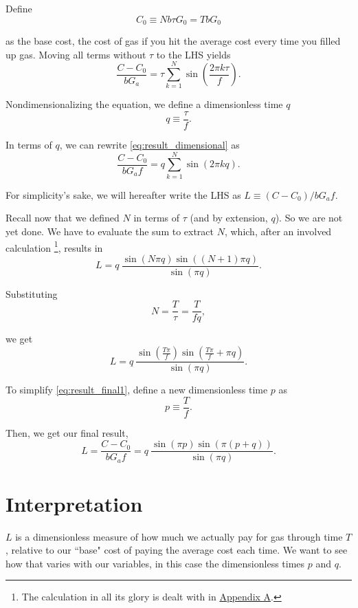 \documentclass[11pt]{article}
\begin{document}
Define 
$$
C_0 \equiv Nb\tau G_0 = TbG_0
$$

 as the base cost, the cost of gas if you hit the average cost every time you filled up gas. Moving all terms without $\tau$ to the LHS yields
\begin{equation}
\frac{C - C_0}{b G_a} = \tau \sum_{k=1}^{N}{\sin \left( \frac{2 \pi k \tau}{f}\right)} \label{eq:result_dimensional}.
\end{equation}

Nondimensionalizing the equation, we define a dimensionless time $q$
$$
q \equiv \frac{\tau}{f}.
$$ 

In terms of $q$, we can rewrite \eqref{eq:result_dimensional} as
\begin{equation}
\frac{C - C_0}{b G_a f} = q \sum_{k=1}^{N}{\sin \left( 2 \pi k q\right)}. \label{eq:result_dimensionless}
\end{equation}

For simplicity's sake, we will hereafter write the LHS as $L \equiv (C - C_0) / b G_a f$. \\

\par
Recall now that we defined $N$ in terms of $\tau$ (and by extension, $q$). So we are not yet done. We have to evaluate the sum to extract $N$, which, after an involved calculation \footnote{The calculation in all its glory is dealt with in \hyperref[subsec:sine_sum]{Appendix A}.}, results in
\begin{equation}
L = q \: \frac{\sin(N\pi q) \sin((N+1)\pi q)}{\sin(\pi q)}. \label{eq:summed_result}
\end{equation}

Substituting 
$$
N = \frac{T}{\tau} = \frac{T}{fq},
$$

we get
\begin{equation}
L = q \: \frac{\sin\left(\frac{T \pi}{f}\right) \sin\left(\frac{T \pi}{f} + \pi q\right)}{\sin(\pi q)}. \label{eq:result_final1}
\end{equation}

To simplify \eqref{eq:result_final1}, define a new dimensionless time $p$ as 
$$
p \equiv \frac{T}{f}.
$$ 

Then, we get our final result,
\begin{equation}
\boxed{L = \frac{C - C_0}{b G_a f} = q \: \frac{\sin(\pi p) \sin(\pi (p+q))}{\sin(\pi q)}}. \label{eq:result_final2}
\end{equation}

\section*{Interpretation}
\label{sec:interpetation}
$L$ is a dimensionless measure of how much we actually pay for gas through time $T$, relative to our ``base" cost of paying the average cost each time. We want to see how that varies with our variables, in this case the dimensionless times $p$ and $q$. \\
\end{document}
